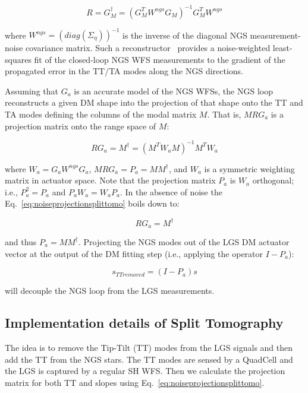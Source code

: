 \documentclass[a4paper,12pt]{article}
\begin{document}
\begin{equation}
 R = G_M^\dagger = (G_M^T W^{ngs} G_M)^{-1} G_M^T W^{ngs}
\end{equation} 

where $W^{ngs} = (diag (\Sigma_\eta ) )^{-1}$ is the inverse of the diagonal NGS measurement-noise covariance matrix.  Such a reconstructor~\cite{gilles2008split} provides a noise-weighted least-squares fit of the
closed-loop NGS WFS measurements to the gradient of the propagated error in the TT/TA modes along the NGS directions.

Assuming that $G_a$ is an accurate model of the NGS WFSs, the NGS loop reconstructs a
given DM shape into the projection of that shape onto the TT and TA modes defining the columns of the modal matrix $M$. That is, $M R G_a$ is a projection matrix onto the range space of $M$:

\begin{equation}\label{eq:noiseprojectionsplittomo}
R G_a =  M^\dagger = (M^T W_a M )^{-1} M^T W_a 
\end{equation} 

where  $W_a = G_a W^{ngs} G_a$,  $M R G_a = P_a = M M^\dagger$, and $W_a$ is a symmetric weighting matrix in actuator space. Note that the projection matrix $P_a$ is $W_a$ orthogonal; i.e., $P_a^2 = P_a$ and $P_a W_a = W_a P_a$. In the absence of noise the Eq.~\ref{eq:noiseprojectionsplittomo} boils down to:

\begin{equation}\label{eq:noiseprojectionsplittomononoise}
R G_a = M^\dagger 
\end{equation} 

and thus $P_a = M M^\dagger $. Projecting the NGS modes out of the LGS DM actuator vector at the output of the DM fitting step (i.e., applying the operator $I - P_a$):

\begin{equation}
s_{TTremoved} = (I-P_a) s
\end{equation} 

will decouple the NGS loop from the LGS measurements.


\subsection{Implementation details of Split Tomography}
The idea is to remove the Tip-Tilt (TT) modes from the LGS signals and then add the TT from the NGS stars. The TT modes are sensed by a QuadCell and the LGS is captured by a regular SH WFS. Then we calculate the projection matrix for both TT and slopes using Eq.~\ref{eq:noiseprojectionsplittomo}. 
\end{document}
